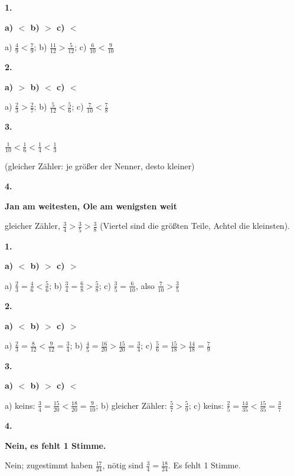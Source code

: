 \documentclass[11pt]{article}
\newcommand{\lsg}[3]{\par\noindent\begin{minipage}[t]{9mm}\textbf{#1}\end{minipage}%
  \begin{minipage}[t]{52mm}\raggedright\bfseries\boldmath #2\end{minipage}\hspace{3mm}%
  \begin{minipage}[t]{\dimexpr\linewidth-64mm\relax}\raggedright\small #3\end{minipage}\par\vspace{4pt}}
\begin{document}
\par\smallskip
{}\par
\par\Needspace{25mm}\vspace{6pt}\noindent\colorbox{black!12}{}\hspace{2mm}{\bfseries Gleicher Nenner oder gleicher Zähler}\par\vspace{4pt}
\lsg{1.}{a) $<$ \quad b) $>$ \quad c) $<$}{a) $\frac{4}{9} < \frac{7}{9}$; b) $\frac{11}{12} > \frac{5}{12}$; c) $\frac{6}{10} < \frac{9}{10}$}
\lsg{2.}{a) $>$ \quad b) $<$ \quad c) $<$}{a) $\frac{2}{3} > \frac{2}{7}$; b) $\frac{5}{12} < \frac{5}{6}$; c) $\frac{7}{10} < \frac{7}{8}$}
\lsg{3.}{$\frac{1}{10} < \frac{1}{6} < \frac{1}{4} < \frac{1}{3}$}{(gleicher Zähler: je größer der Nenner, desto kleiner)}
\lsg{4.}{Jan am weitesten, Ole am wenigsten weit}{gleicher Zähler, $\frac{3}{4} > \frac{3}{5} > \frac{3}{8}$ (Viertel sind die größten Teile, Achtel die kleinsten).}
\par\Needspace{25mm}\vspace{6pt}\noindent\colorbox{black!12}{}\hspace{2mm}{\bfseries Gleichnamig machen, dann vergleichen}\par\vspace{4pt}
\lsg{1.}{a) $<$ \quad b) $>$ \quad c) $>$}{a) $\frac{2}{3} = \frac{4}{6} < \frac{5}{6}$; b) $\frac{3}{4} = \frac{6}{8} > \frac{5}{8}$; c) $\frac{3}{5} = \frac{6}{10}$, also $\frac{7}{10} > \frac{3}{5}$}
\lsg{2.}{a) $<$ \quad b) $>$ \quad c) $>$}{a) $\frac{2}{3} = \frac{8}{12} < \frac{9}{12} = \frac{3}{4}$; b) $\frac{4}{5} = \frac{16}{20} > \frac{15}{20} = \frac{3}{4}$; c) $\frac{5}{6} = \frac{15}{18} > \frac{14}{18} = \frac{7}{9}$}
\lsg{3.}{a) $<$ \quad b) $>$ \quad c) $<$}{a) keins: $\frac{3}{4} = \frac{15}{20} < \frac{18}{20} = \frac{9}{10}$; b) gleicher Zähler: $\frac{5}{7} > \frac{5}{9}$; c) keins: $\frac{2}{5} = \frac{14}{35} < \frac{15}{35} = \frac{3}{7}$}
\lsg{4.}{Nein, es fehlt 1 Stimme.}{Nein; zugestimmt haben $\frac{17}{24}$, nötig sind $\frac{3}{4} = \frac{18}{24}$. Es fehlt 1 Stimme.}
\par\Needspace{25mm}\vspace{6pt}\noindent\colorbox{black!12}{}\hspace{2mm}{\bfseries Am Zahlenstrahl: ablesen, eintragen, ordnen}\par\vspace{4pt}
\end{document}
